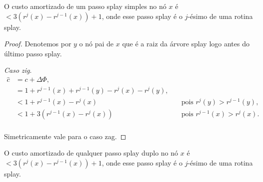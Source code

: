 \begin{lemma}
    O custo amortizado de um passo splay simples no nó $x$ é $< 3(r^{j}(x) - r^{j-1}(x)) + 1$, onde esse passo splay é o $j$-ésimo de uma rotina splay.
\end{lemma}

\begin{proof}
    Denotemos por $y$ o nó pai de $x$ que é a raiz da árvore splay logo antes do último passo splay.

    \textit{Caso zig}.   
    \begin{align*}
        \hat{c} &= c + \Delta \Phi,\\
        &= 1 + r^{j-1}(x) + r^{j-1}(y) - r^{j}(x) - r^{j}(y), \quad & \text{}\\
        &< 1 + r^{j-1}(x) - r^{j}(x) \quad & \text{pois $r^{j}(y) > r^{j-1}(y)$},\\
        &< 1 + 3(r^{j-1}(x) - r^{j}(x)) \quad & \text{pois $r^{j-1}(x) > r^{j}(x)$}.\\
    \end{align*}

    Simetricamente vale para o caso zag.
\end{proof}

\newpage

\begin{lemma}
    O custo amortizado de qualquer passo splay duplo no nó $x$ é $< 3(r^{j}(x) - r^{j-1}(x)) + 1$, onde esse passo splay é o $j$-ésimo de uma rotina splay.
\end{lemma}

